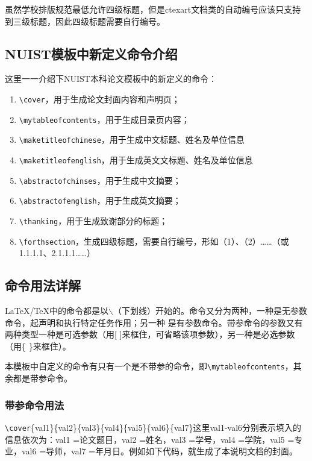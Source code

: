 虽然学校排版规范最低允许四级标题，但是ctexart文档类的自动编号应该只支持到三级标题，因此四级标题需要自行编号。

\subsection{NUIST模板中新定义命令介绍}
这里一一介绍下NUIST本科论文模板中的新定义的命令：
{\color{blue}
\begin{enumerate}
\item \verb|\cover|，用于生成论文封面内容和声明页；
\item \verb|\mytableofcontents|，用于生成目录页内容；
\item \verb|\maketitleofchinese|，用于生成中文标题、姓名及单位信息
\item \verb|\maketitleofenglish|，用于生成英文文标题、姓名及单位信息
\item \verb|\abstractofchinses|，用于生成中文摘要；
\item \verb|\abstractofenglish|，用于生成英文摘要；
\item \verb|\thanking|，用于生成致谢部分的标题；
\item \verb|\forthsection|，生成四级标题，需要自行编号，形如（1）、（2）……（或1.1.1.1、2.1.1.1……）
\end{enumerate}
}


\subsection{命令用法详解}
\LaTeX/\TeX 中的命令都是以$\backslash$（下划线）开始的。命令又分为两种，一种是无参数命令，起声明和执行特定任务作用；另一种 是有参数命令。带参命令的参数又有两种类型一种是可选参数（用[ ]来框住，可省略该项参数），另一种是必选参数（用\{ \}来框住）。

本模板中自定义的命令有只有一个是不带参的命令，即\verb|\mytableofcontents|，其余都是带参命令。

\subsubsection{带参命令用法}
\verb|\cover|\{val1\}\{val2\}\{val3\}\{val4\}\{val5\}\{val6\}\{val7\}这里val1-val6分别表示填入的信息依次为：val1 =论文题目，val2 =姓名，val3 =学号，val4 =学院，val5 =专业，val6 =导师，val7 =年月日。例如如下代码，就生成了本说明文档的封面。

